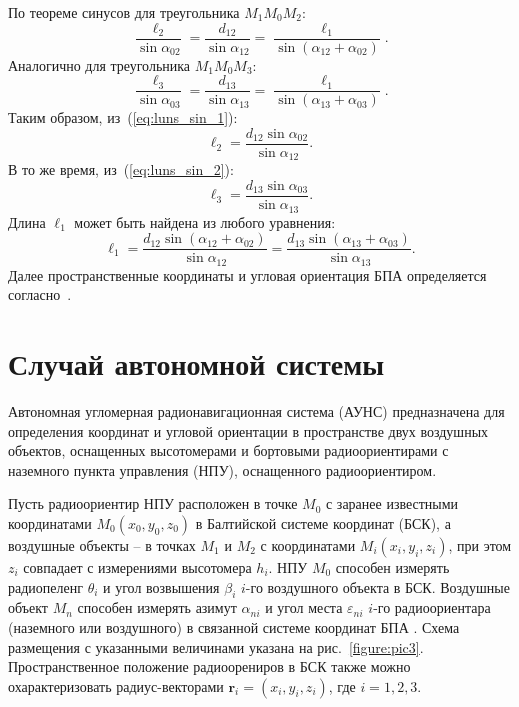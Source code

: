 \documentclass[a4paper,12pt]{article}
\begin{document}
По теореме синусов для треугольника $M_1 M_0 M_2$:
\begin{equation}\label{eq:luns_sin_1}
    \frac{\ell_2}{\sin\alpha_{02}} = \frac{d_{12}}{\sin\alpha_{12}} = \frac{\ell_1}{\sin\left(\alpha_{12} + \alpha_{02}\right)}.
\end{equation}
Аналогично для треугольника $M_1 M_0 M_3$:
\begin{equation}\label{eq:luns_sin_2}
    \frac{\ell_3}{\sin\alpha_{03}} = \frac{d_{13}}{\sin\alpha_{13}} = \frac{\ell_1}{\sin\left(\alpha_{13} + \alpha_{03}\right)}.
\end{equation}
Таким образом, из~(\ref{eq:luns_sin_1}):
\begin{equation*}
    \ell_2 = \frac{d_{12}\sin\alpha_{02}}{\sin\alpha_{12}}.
\end{equation*}
В то же время, из~(\ref{eq:luns_sin_2}):
\begin{equation*}
    \ell_3 = \frac{d_{13}\sin\alpha_{03}}{\sin\alpha_{13}}.
\end{equation*}
Длина $\ell_1$ может быть найдена из любого уравнения:
\begin{equation*}
    \ell_1 = \frac{d_{12}\sin\left(\alpha_{12} + \alpha_{02}\right)}{\sin\alpha_{12}} = \frac{d_{13}\sin\left(\alpha_{13} + \alpha_{03}\right)}{\sin\alpha_{13}}.
\end{equation*}
Далее пространственные координаты и угловая ориентация БПА определяется согласно~\cite{antennas}.


\section{Случай автономной системы}
Автономная угломерная радионавигационная система (АУНС) предназначена для определения
координат и угловой ориентации в пространстве двух воздушных объектов, оснащенных
высотомерами и бортовыми радиоориентирами с наземного пункта управления (НПУ),
оснащенного радиоориентиром.

Пусть радиоориентир НПУ расположен в точке $M_0$ с заранее известными координатами
$M_0\left(x_0, y_0, z_0\right)$ в Балтийской системе координат (БСК), а воздушные объекты
-- в точках $M_1$ и $M_2$ с координатами $M_i\left(x_i, y_i, z_i\right)$, при этом $z_i$
совпадает с измерениями высотомера $h_i$. НПУ $M_0$ способен измерять радиопеленг $\theta_i$
и угол возвышения $\beta_i$ $i$-го воздушного объекта в БСК. Воздушные объект $M_n$
способен измерять азимут $\alpha_{ni}$ и угол места $\varepsilon_{ni}$ $i$-го
радиоориентара (наземного или воздушного) в связанной системе координат БПА \cite{antennas}.
Схема размещения с указанными величинами указана на рис.~\ref{figure:pic3}.
Пространственное положение радиоорениров в БСК также можно охарактеризовать радиус-векторами
$\mathbf{r}_i = \left(x_i, y_i, z_i\right)$, где $i = 1,2,3$.
\end{document}
